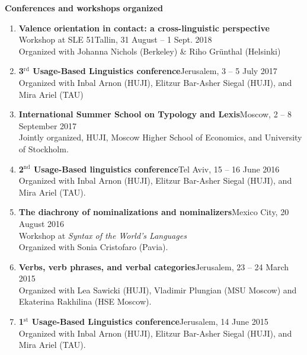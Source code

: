 \documentclass[letterpaper,11pt]{article}
\newcommand{\resheading}[1]{
\vspace*{6pt}
{\large \colorbox{mygrey}{\begin{minipage}{\textwidth}{\textbf{#1 \vphantom{p\^{E}}}}\end{minipage}}}
}
\begin{document}
\resheading{Conferences and workshops organized} 
\begin{enumerate}
\vspace{-0.025 in}
\vspace*{-8pt}
\item \textbf{Valence orientation in contact: a cross-linguistic perspective}\\Workshop at SLE 51\hfill{Tallin, 31 August -- 1 Sept. 2018}\\
Organized with Johanna Nichols (Berkeley) \& Riho Gr\"unthal (Helsinki)

\item \textbf{3$^{\textrm{rd}}$ Usage-Based Linguistics conference}\hfill{Jerusalem, 3 -- 5 July 2017}\\Organized with Inbal Arnon (HUJI), Elitzur Bar-Asher Siegal (HUJI), and Mira Ariel (TAU)\\

\item \textbf{International Summer School on Typology and Lexis}\hfill{Moscow, 2 -- 8 September 2017}\\
Jointly organized, HUJI, Moscow Higher School of Economics, and University of Stockholm.

\item \textbf{2$^{\textrm{nd}}$ Usage-Based linguistics conference}\hfill{Tel Aviv, 15 -- 16 June 2016}\\Organized with Inbal Arnon (HUJI), Elitzur Bar-Asher Siegal (HUJI), and Mira Ariel (TAU).

\item \textbf{The diachrony of nominalizations and nominalizers}\hfill{Mexico City, 20 August 2016}\\
{Workshop at \textit{Syntax of the World’s Languages}}\\ 
Organized with Sonia Cristofaro (Pavia).

\item \textbf{Verbs, verb phrases, and verbal categories}\hfill{Jerusalem, 23 -- 24 March 2015}\\
Organized with Lea Sawicki (HUJI),  Vladimir Plungian (MSU Moscow) and Ekaterina Rakhilina (HSE Moscow).

\item \textbf{1$^{\textrm{st}}$ Usage-Based Linguistics conference}\hfill{Jerusalem, 14 June 2015}\\
Organized with Inbal Arnon (HUJI), Elitzur Bar-Asher Siegal (HUJI), and Mira Ariel (TAU).


\end{enumerate}
\end{document}
